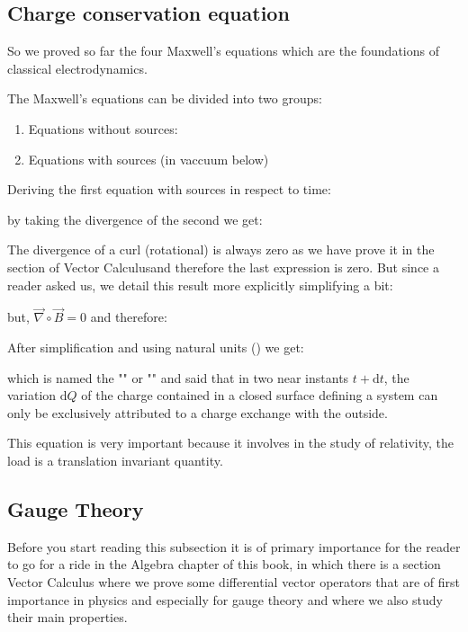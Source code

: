 	\subsection{Charge conservation equation}\label{charge conservation equation}
	So we proved so far the four Maxwell's equations which are the foundations of classical electrodynamics.

	The Maxwell's equations can be divided into two groups:
	\begin{enumerate}
		\item Equations without sources:
		

		\item Equations with sources (in vaccuum below)
		
	\end{enumerate}
	Deriving the first equation with sources in respect to time:
	
	by taking the divergence of the second we get:
	
	The divergence of a curl (rotational) is always zero as we have prove it in the section of Vector Calculusand therefore the last expression is zero. But since a reader asked us, we detail this result more explicitly simplifying a bit:
	
	but, $\vec{\nabla}\circ\vec{B}=0$ and therefore:
	
	After simplification and using natural units () we get:
	
	which is named the  "" or "" and said that in two near instants $t+\mathrm{d}t$, the variation $\mathrm{d}Q$ of the charge contained in a closed surface defining a system can only be exclusively  attributed to a charge exchange with the outside.
	
	This equation is very important because it involves in the study of relativity, the load is a translation invariant quantity.
	
	\subsection{Gauge Theory}\label{gauge theory}
	Before you start reading this subsection it is of primary importance for the reader to go for a ride in the Algebra chapter of this book, in which there is a section Vector Calculus where we prove some differential vector operators that are of first importance in physics and especially for gauge theory and where we also study their main properties.
	
